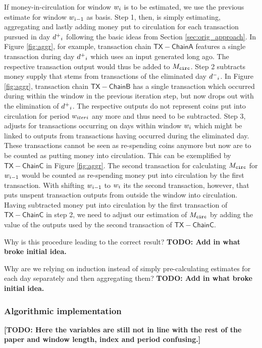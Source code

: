 If money-in-circulation for window \({w}_{{i}}\) is to be estimated, we use the previous estimate for window \({w}_{{i}-1}\) as basis. %
Step 1, then, is simply estimating, aggregating and lastly adding money put to circulation for each transaction pursued in day \({d^{+}}_{{i}}\) following the basic ideas from Section \ref{sec:orig_approach}. %
In Figure \ref{fig:aggr}, for example, transaction chain \(\mathsf{TX-Chain A}\) features a single transaction during day \({d^{+}}_{{i}}\) which uses an input generated long ago. The respective transaction output would thus be added to \({M_{\mathtt{circ}}}\).
Step 2 subtracts money supply that stems from transactions of the eliminated day \({d^{-}}_{{i}}\). %
In Figure \ref{fig:aggr}, transaction chain \(\mathsf{TX-Chain B}\) has a single transaction which occurred during within the window in the previous iteration step, but now drops out with the elimination of \({d^{+}}_{{i}}\). %
The respective outputs do not represent coins put into circulation for period \({w}_{iteri}\) any more and thus need to be subtracted. %
Step 3, adjusts for transactions occurring on days within window \({w}_{i}\) which might be linked to outputs from transactions having occurred during the eliminated day. %
These transactions cannot be seen as re-spending coins anymore but now are to be counted as putting money into circulation. %
This can be exemplified by \(\mathsf{TX-Chain C}\) in Figure \ref{fig:aggr}. %
The second transaction for calculating \({M_{\mathtt{circ}}}\) for \({w}_{{i}-1}\) would be counted as re-spending money put into circulation by the first transaction. %
With shifting \({w}_{{i}-1}\) to \({w}_{{i}}\) its the second transaction, however, that puts unspent transaction outputs from outside the window into circulation. %
Having subtracted money put into circulation by the first transaction of \(\mathsf{TX-Chain C}\) in step 2, we need to adjust our estimation of \({M_{\mathtt{circ}}}\) by adding the value of the outputs used by the second transaction of \(\mathsf{TX-Chain C}\). %

Why is this procedure leading to the correct result? %
\textbf{TODO: Add in what broke initial idea.}


Why are we relying on induction instead of simply pre-calculating estimates for each day separately and then aggregating them? %
\textbf{TODO: Add in what broke initial idea.}


\subsubsection{Algorithmic implementation}
\label{sec:novel_impl_algo}%
\textbf{[TODO: Here the variables are still not in line with the rest of the paper and window length, index and period confusing.]}

